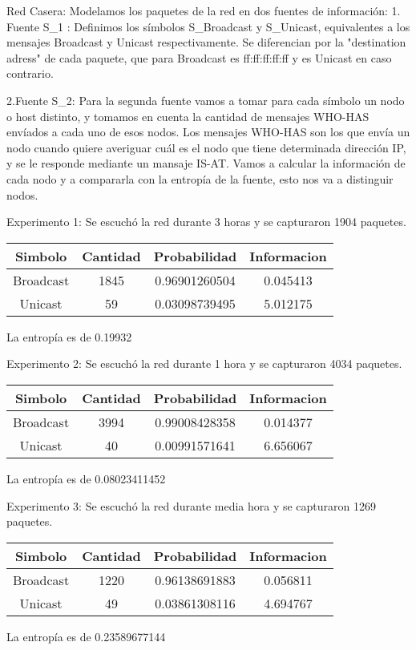 Red Casera:
Modelamos los paquetes de la red en dos fuentes de información:
1. Fuente S\_1 : Definimos los símbolos S\_Broadcast y S\_Unicast, equivalentes a los mensajes Broadcast y Unicast respectivamente. Se diferencian por la "destination adress" de cada paquete, que para Broadcast es ff:ff:ff:ff:ff y es Unicast en caso contrario.



2.Fuente S\_2: Para la segunda fuente vamos a tomar para cada símbolo un nodo o host distinto, y tomamos en cuenta la cantidad de mensajes WHO-HAS envíados a cada uno de esos nodos.
	Los mensajes WHO-HAS son los que envía un nodo cuando quiere averiguar cuál es el nodo que tiene determinada dirección IP, y se le responde mediante un mansaje IS-AT.
Vamos a calcular la información de cada nodo y a compararla con la entropía de la fuente, esto nos va a distinguir nodos.


Experimento 1:
Se escuchó la red durante 3 horas y se capturaron 1904 paquetes.
\begin{center}
 \begin{tabular}{||c c c c||} 
 \hline
 Simbolo & Cantidad & Probabilidad & Informacion \\ [0.5ex] 
 \hline\hline
 Broadcast & 1845 & 0.96901260504 & 0.045413 \\ 
 \hline
 Unicast & 59 & 0.03098739495 & 5.012175 \\[1ex] 
 \hline
\end{tabular}
\end{center}
La entropía es de 0.19932

Experimento 2:
Se escuchó la red durante 1 hora y se capturaron 4034 paquetes.
\begin{center}
 \begin{tabular}{||c c c c||} 
 \hline
 Simbolo & Cantidad & Probabilidad & Informacion \\ [0.5ex] 
 \hline\hline
 Broadcast & 3994 & 0.99008428358 & 0.014377 \\ 
 \hline
 Unicast & 40 & 0.00991571641 & 6.656067 \\[1ex] 
 \hline
\end{tabular}
\end{center}
La entropía es de 0.08023411452

Experimento 3:
Se escuchó la red durante media hora y se capturaron 1269 paquetes.
\begin{center}
 \begin{tabular}{||c c c c||} 
 \hline
 Simbolo & Cantidad & Probabilidad & Informacion \\ [0.5ex] 
 \hline\hline
 Broadcast & 1220 & 0.96138691883 & 0.056811 \\ 
 \hline
 Unicast & 49 & 0.03861308116 & 4.694767 \\[1ex] 
 \hline
\end{tabular}
\end{center}
La entropía es de 0.23589677144


